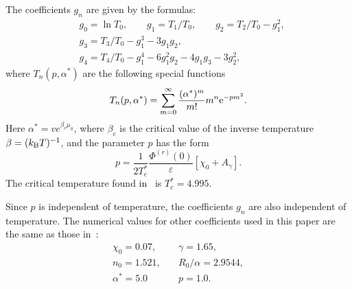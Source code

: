 The coefficients $g_n$ are given by the formulas:
\begin{align}
	& g_0 = \ln T_0, \qquad g_1 = T_1/T_0, \qquad g_2 = T_2/T_0 - g_1^2,  
	\nonumber \\
	& g_3 = T_3/T_0 - g_1^3 - 3g_1 g_2, 
	\nonumber\\
	& g_4 = T_4/T_0 - g_1^4 - 6 g_1^2 g_2 - 4 g_1 g_3 - 3 g_2^2, 
\end{align}
where $T_n(p,\alpha^*)$ are the following special functions
\begin{equation}
	T_n(p,\alpha^*) = \sum_{m=0}^{\infty} \frac{(\alpha^*)^m}{m!} m^n {\rm e}^{-pm^2}.
\end{equation}
Here $\alpha^*=v e^{\beta_c\mu_0}$, where $\beta_c$ is the critical value of the inverse temperature $\beta = (k_{\rm B}T)^{-1}$, and the parameter $p$ has the form
\begin{equation}
	p = \frac{1}{2T^*_c} \frac{\Phi^{(r)}(0)}{\varepsilon} [\chi_0 + A_\gamma].
\end{equation} 
The critical temperature found in~\cite{KD20} is $T_c^* = 4.995.$

Since $p$ is independent of temperature, the coefficients $g_n$ are also independent of temperature. The numerical values for other coefficients used in this paper are the same as those in~\cite[eqs.~(5), (23), and~(24)]{KD20}:
\begin{eqnarray}
	\label{params}
	\chi_0 = 0.07, & \quad \gamma = 1.65, \nonumber\\
	n_0 = 1.521, & \quad R_0/\alpha = 2.9544, \nonumber\\
	\alpha^* = 5.0 & \quad p = 1.0.
\end{eqnarray}

